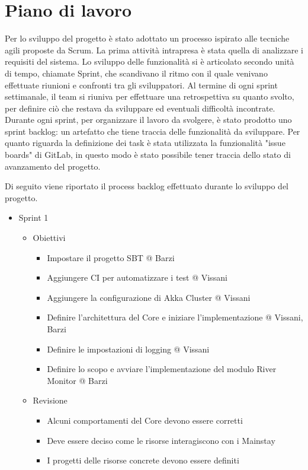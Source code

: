 \documentclass{scrartcl}
\begin{document}
\section{Piano di lavoro}

Per lo sviluppo del progetto è stato adottato un processo ispirato alle tecniche agili proposte da Scrum.
La prima attività intrapresa è stata quella di analizzare i requisiti del sistema. Lo sviluppo delle funzionalità si è articolato secondo unità di tempo, chiamate Sprint, che scandivano il ritmo con il quale venivano effettuate riunioni e confronti tra gli sviluppatori. Al termine di ogni sprint settimanale, il team si riuniva per effettuare una retrospettiva su quanto svolto, per definire ciò che restava da sviluppare ed eventuali difficoltà incontrate. Durante ogni sprint, per organizzare il lavoro da svolgere, è stato prodotto uno sprint backlog: un artefatto che tiene traccia delle funzionalità da sviluppare. Per quanto riguarda la definizione dei task è stata utilizzata la funzionalità "issue boards" di GitLab\cite{GitLab}, in questo modo è stato possibile tener traccia dello stato di avanzamento del progetto.

Di seguito viene riportato il process backlog effettuato durante lo sviluppo del progetto.

\begin{itemize}
    \item Sprint 1
          \begin{itemize}
              \item Obiettivi
                    \begin{itemize}
                        \item Impostare il progetto SBT @ Barzi
                        \item Aggiungere CI per automatizzare i test @ Vissani
                        \item Aggiungere la configurazione di Akka Cluster @ Vissani
                        \item Definire l'architettura del Core e iniziare l'implementazione @ Vissani, Barzi
                        \item Definire le impostazioni di logging @ Vissani
                        \item Definire lo scopo e avviare l'implementazione del modulo River Monitor @ Barzi
                    \end{itemize}
              \item Revisione
                    \begin{itemize}
                        \item Alcuni comportamenti del Core devono essere corretti
                        \item Deve essere deciso come le risorse interagiscono con i Mainstay
                        \item I progetti delle risorse concrete devono essere definiti
                    \end{itemize}
          \end{itemize}
\end{itemize}
\end{document}
